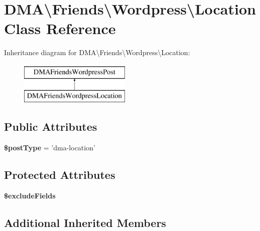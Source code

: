 \hypertarget{classDMA_1_1Friends_1_1Wordpress_1_1Location}{\section{D\-M\-A\textbackslash{}Friends\textbackslash{}Wordpress\textbackslash{}Location Class Reference}
\label{classDMA_1_1Friends_1_1Wordpress_1_1Location}
}
Inheritance diagram for D\-M\-A\textbackslash{}Friends\textbackslash{}Wordpress\textbackslash{}Location\-:\begin{figure}[H]
\begin{center}
\leavevmode
\includegraphics[height=2.000000cm]{d3/d8d/classDMA_1_1Friends_1_1Wordpress_1_1Location}
\end{center}
\end{figure}
\subsection*{Public Attributes}
\begin{DoxyCompactItemize}
\item 
\hypertarget{classDMA_1_1Friends_1_1Wordpress_1_1Location_a40f4ecf15a53d860bfbba3484f2999bf}{{\bfseries \$post\-Type} = 'dma-\/location'}\label{classDMA_1_1Friends_1_1Wordpress_1_1Location_a40f4ecf15a53d860bfbba3484f2999bf}

\end{DoxyCompactItemize}
\subsection*{Protected Attributes}
\begin{DoxyCompactItemize}
\item 
{\bfseries \$exclude\-Fields}
\end{DoxyCompactItemize}
\subsection*{Additional Inherited Members}


